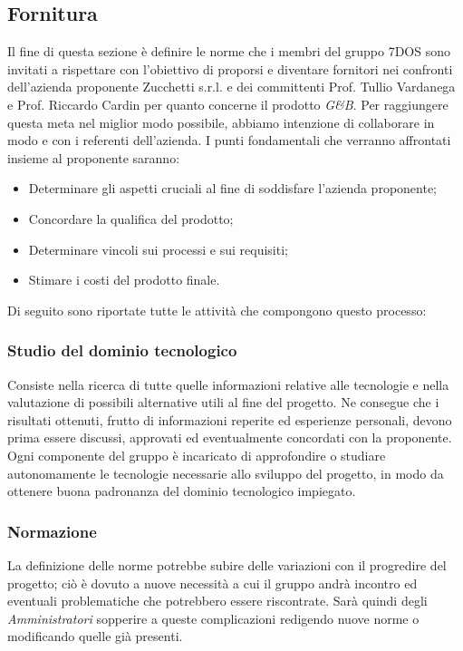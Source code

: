 \subsection{Fornitura}
Il fine di questa sezione è definire le norme che i membri del gruppo 7DOS sono invitati a rispettare con l'obiettivo di proporsi e diventare fornitori nei confronti dell'azienda proponente Zucchetti s.r.l. e dei committenti Prof. Tullio Vardanega e Prof. Riccardo Cardin per quanto concerne il prodotto \emph{G\&B}.
Per raggiungere questa meta nel miglior modo possibile, abbiamo intenzione di collaborare in modo  e  con i referenti dell'azienda.
I punti fondamentali che verranno affrontati insieme al proponente saranno:
\begin{itemize}
\item Determinare gli aspetti cruciali al fine di soddisfare l'azienda proponente;
\item Concordare la qualifica del prodotto;
\item Determinare vincoli sui processi e sui requisiti;
\item Stimare i costi del prodotto finale.
\end{itemize}
Di seguito sono riportate tutte le attività che compongono questo processo:

\subsubsection{Studio del dominio tecnologico}
Consiste nella ricerca di tutte quelle informazioni relative alle tecnologie e nella valutazione di possibili alternative utili al fine del progetto. Ne consegue che i risultati ottenuti, frutto di informazioni reperite ed esperienze personali, devono prima essere discussi, approvati ed eventualmente concordati con la proponente.
Ogni componente del gruppo è incaricato di approfondire o studiare autonomamente le tecnologie necessarie allo sviluppo del progetto, in modo da ottenere buona padronanza del dominio tecnologico impiegato.

\subsubsection{Normazione}
La definizione delle norme potrebbe subire delle variazioni con il progredire del progetto; ciò è dovuto a nuove necessità a cui il gruppo andrà incontro ed eventuali problematiche che potrebbero essere riscontrate. Sarà quindi  degli \emph{Amministratori} sopperire a queste complicazioni redigendo nuove norme o modificando quelle già presenti.

